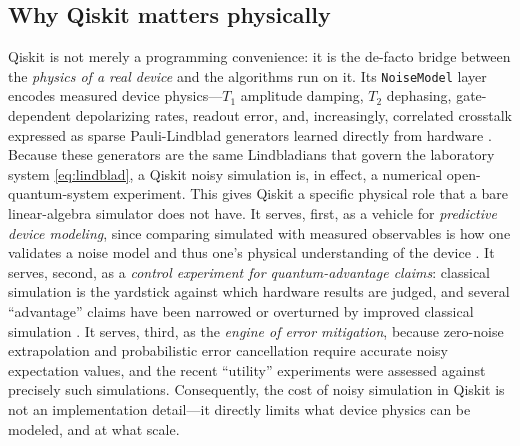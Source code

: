 \documentclass{ieeeaccess}
\begin{document}
\subsection{Why Qiskit matters physically}
Qiskit \cite{qiskit_aer,qiskit2024,wille2019qiskit} is not merely a programming convenience: it is the
de-facto bridge between the \emph{physics of a real device} and the algorithms run on it. Its
\texttt{NoiseModel} layer encodes measured device physics---$T_1$ amplitude damping, $T_2$ dephasing,
gate-dependent depolarizing rates, readout error, and, increasingly, correlated crosstalk expressed as
sparse Pauli-Lindblad generators learned directly from hardware \cite{sparse_pauli_lindblad2023,
georgopoulos2021modeling}. Because these generators are the same Lindbladians that govern the
laboratory system \eqref{eq:lindblad}, a Qiskit noisy simulation is, in effect, a numerical open-quantum-system
experiment. This gives Qiskit a specific physical role that a bare linear-algebra simulator does not have.
It serves, first, as a vehicle for \emph{predictive device modeling}, since comparing simulated with
measured observables is how one validates a noise model and thus one's physical understanding of the
device \cite{georgopoulos2021modeling,nation2023suppressing}. It serves, second, as a \emph{control
experiment for quantum-advantage claims}: classical simulation is the yardstick against which hardware
results are judged, and several ``advantage'' claims have been narrowed or overturned by improved
classical simulation \cite{arute2019supremacy,pan2022sycamore,markov2008tensor,gray2021hyper}. It serves,
third, as the \emph{engine of error mitigation}, because zero-noise extrapolation and probabilistic error
cancellation \cite{temme2017,kandala2019mitigation,endo2021mitigation} require accurate noisy expectation
values, and the recent ``utility'' experiments \cite{kim2023utility} were assessed against precisely such
simulations.
Consequently, the cost of noisy simulation in Qiskit is not an implementation detail---it directly limits
what device physics can be modeled, and at what scale.
\end{document}
